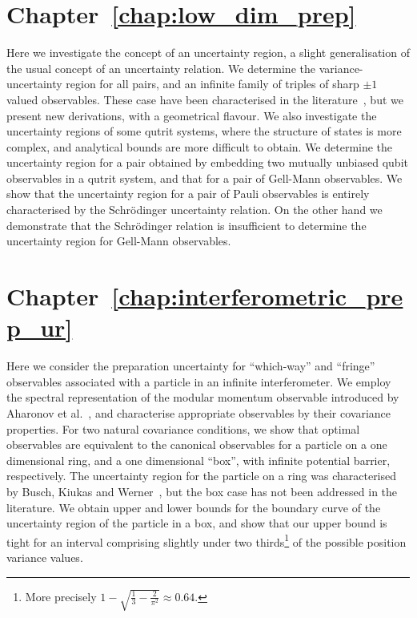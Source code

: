 \section*{Chapter~\ref{chap:low_dim_prep}}

Here we investigate the concept of an uncertainty region, a slight generalisation of the usual concept of an uncertainty relation. We determine the variance-uncertainty region for all pairs, and an infinite family of triples of sharp $\pm 1$ valued observables. These case have been characterised in the literature~\cites{LiQiao2015}{AbbottAlzieuHallBranciard2016}, but we present new derivations, with a geometrical flavour. We also investigate the uncertainty regions of some qutrit systems, where the structure of states is more complex, and analytical bounds are more difficult to obtain. We determine the uncertainty region for a pair obtained by embedding two mutually unbiased qubit observables in a qutrit system, and that for a pair of Gell-Mann observables. We show that the uncertainty region for a pair of Pauli observables is entirely characterised by the Schr{\"o}dinger uncertainty relation. On the other hand we demonstrate that the Schr{\"o}dinger relation is insufficient to determine the uncertainty region for Gell-Mann observables.

\section*{Chapter~\ref{chap:interferometric_prep_ur}}

Here we consider the preparation uncertainty for ``which-way'' and ``fringe'' observables associated with a particle in an infinite interferometer. We employ the spectral representation of the modular momentum observable introduced by Aharonov et al.~\cite{aharonov-modular-variables}, and characterise appropriate observables by their covariance properties. For two natural covariance conditions, we show that optimal observables are equivalent to the canonical observables for a particle on a one dimensional ring, and a one dimensional ``box'', with infinite potential barrier, respectively. The uncertainty region for the particle on a ring was characterised by Busch, Kiukas and Werner~\cite{sharp-ur-num-angle}, but the box case has not been addressed in the literature. We obtain upper and lower bounds for the boundary curve of the uncertainty region of the particle in a box, and show that our upper bound is tight for an interval comprising slightly under two thirds\footnote{More precisely $1 - \sqrt{\frac{1}{3} - \frac{2}{\pi^2}} \approx 0.64$.} of the possible position variance values.

